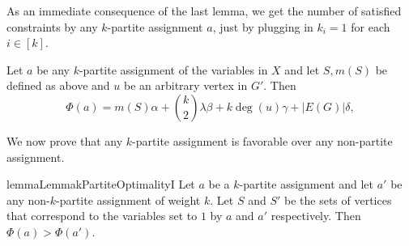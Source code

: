 \documentclass[a4paper,UKenglish,cleveref, autoref, thm-restate,numberwithinsect]{lipics-v2021}
\begin{document}
As an immediate consequence of the last lemma, we get the number of satisfied constraints by any $k$-partite assignment $a$, just by plugging in $k_i=1$ for each $i\in [k]$.
\begin{corollary}\label{cor:solution-k-partite-assignment}
    Let $a$ be any $k$-partite assignment of the variables in $X$ and let $S, m(S)$ be defined as above and $u$ be an arbitrary vertex in $G'$.
    Then
    \[
    \Phi(a) = m(S)\alpha + \binom{k}{2} \lambda \beta + k \deg(u) \gamma + |E(G)| \delta,
    \]
\end{corollary}
We now prove that any $k$-partite assignment is favorable over any non-partite assignment.
\begin{restatable}{lemma}{LemmakPartiteOptimalityI}\label{lemma:optimality-of-k-partite-assignment}
    Let $a$ be a $k$-partite assignment and let $a'$ be any non-$k$-partite assignment of weight $k$.
    Let $S$ and $S'$ be the sets of vertices that correspond to the variables set to $1$ by $a$ and $a'$ respectively.
    Then $\Phi(a)>\Phi(a')$.
\end{restatable}
\end{document}
